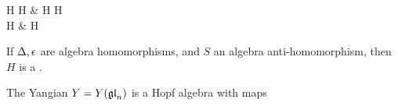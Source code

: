 \documentclass{article}
\begin{document}
\begin{tkz}
H \otimes H \arrow[r,"\id \otimes S"] & H \otimes H \arrow[d,"m"] \\
H \arrow[u,"\Delta"]  & H
\end{tkz}

\begin{definition}
If $\Delta,\epsilon$ are algebra homomorphisms, and $S$ an algebra anti-homomorphism, then $H$ is a . 
\end{definition}

\begin{prop}
The Yangian $Y = Y(\mathfrak{gl}_n)$ is a Hopf algebra with maps 
\end{prop}
\end{document}
